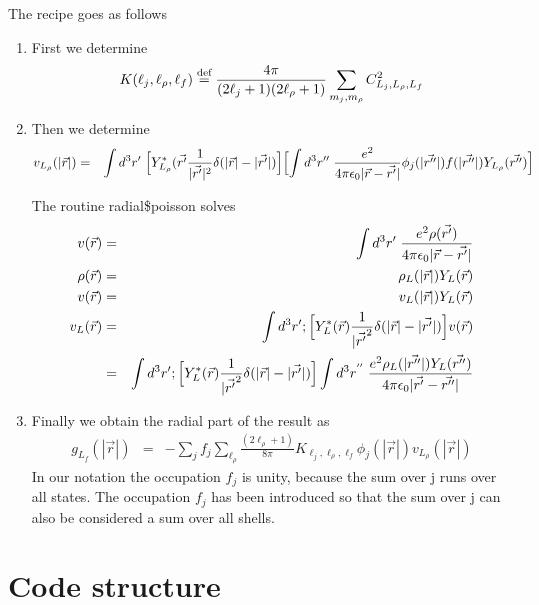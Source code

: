 \documentclass[11pt,a4paper]{report}
\begin{document}
The recipe goes as follows 
\begin{enumerate}
\item First we determine
\begin{eqnarray*}
K(\ell_j,\ell_\rho,\ell_f)\stackrel{\text{def}}{=}
\frac{4\pi}{(2\ell_j+1)(2\ell_\rho+1)}\sum_{m_j,m_\rho}C_{L_j,L_\rho,L_f}^2
\end{eqnarray*}

\item Then we determine
\begin{eqnarray*}
v_{L_\rho}(|\vec{r}|)&=&
\int d^3r'\;\Bigl[Y^*_{L_\rho}(\vec{r'}\frac{1}{|\vec{r'}|^2}\delta(|\vec{r}|-|\vec{r'}|)\Bigr]
\Bigl[\int d^3r''\; \frac{e^2}
{4\pi\epsilon_0|\vec{r}-\vec{r'}|}
\phi_j(|\vec{r''}|)f(|\vec{r''}|)Y_{L_\rho}(\vec{r''})\Bigr]
\end{eqnarray*}

The routine radial\$poisson solves
\begin{eqnarray*}
v(\vec{r})&=&\int d^3r'\;\frac{e^2\rho(\vec{r'})}{4\pi\epsilon_0|\vec{r}-\vec{r'}|}
\\
\rho(\vec{r})&=&\rho_L(|\vec{r}|)Y_L(\vec{r})
\\
v(\vec{r})&=&v_L(|\vec{r}|)Y_L(\vec{r})
\\
v_L(\vec{r})
&=&\int d^3r'; \Bigl[Y^*_L(\vec{r})\frac{1}{|\vec{r'}^2}
\delta(|\vec{r}|-|\vec{r'}|)\Bigr]
v(\vec{r})
\\
&=&\int d^3r'; \Bigl[Y^*_L(\vec{r})\frac{1}{|\vec{r'}^2}
\delta(|\vec{r}|-|\vec{r'}|)\Bigr]
\int d^3r^{''}\;\frac{e^2\rho_L(|\vec{r''}|)Y_L(\vec{r''})}{4\pi\epsilon_0|\vec{r'}-\vec{r''}|}
\end{eqnarray*}

\item Finally we obtain the radial part of the result as
\begin{eqnarray*}
g_{L_f}(|\vec{r}|)&=&-\sum_{j}f_j\sum_{\ell_\rho}
\frac{(2\ell_\rho+1)}{8\pi}K_{\ell_j,\ell_\rho,\ell_f}
\phi_j(|\vec{r}|)v_{L_\rho}(|\vec{r}|)
\end{eqnarray*}
In our notation the
occupation $f_j$ is unity, because the sum over j runs over all
states.  The occupation $f_j$ has been introduced so that the sum over
j can also be considered a sum over all shells.
\end{enumerate}

\chapter{Code structure}
\end{document}
